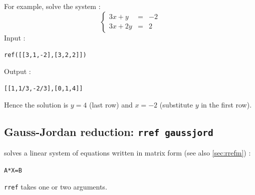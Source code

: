 \documentclass[a4paper,11pt]{book}
\begin{document}
For example, solve the system :
\[ \left \{
\begin{array}{lcr} 3x + y & = &-2 \\3x +2y & =& 2 \end{array}\right.
\] 
Input  :
\begin{center}{\tt ref([[3,1,-2],[3,2,2]])}\end{center}
Output :
\begin{center}{\tt [[1,1/3,-2/3],[0,1,4]]}\end{center}
Hence the solution is $y=4$ (last row) and $x=-2$ (substitute $y$ 
in the first row).

\subsection{Gauss-Jordan reduction: {\tt rref gaussjord}}\label{sec:rref}
 solves a linear system of equations written in
matrix form (see also \ref{sec:rrefm}) :
 \begin{center}{\tt A*X=B}\end{center}
{\tt rref} takes one or two arguments.
\end{document}
